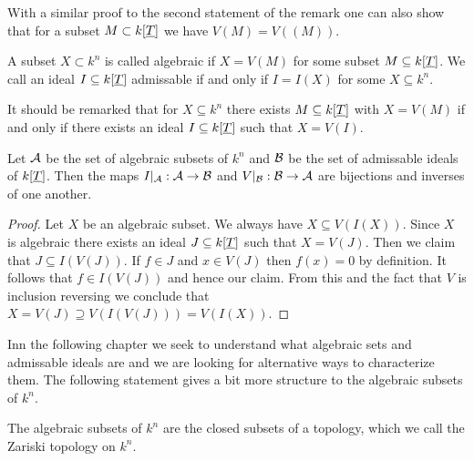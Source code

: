 \documentclass[../notes.tex]{subfiles}
\begin{document}
\noindent
With a similar proof to the second statement of the remark one can also show that
for a subset $M \subset k[{\underline{T}}]$ we have $V(M) = V((M))$.

\smallskip
\begin{defi}{}{}
  A subset $X \subset k^n$ is called algebraic if $X = V(M)$ for some subset
  $M \subseteq k[{\underline{T}}]$. We call an ideal $I \subseteq k[{\underline{T}}]$ admissable
  if and only if $I = I(X)$ for some $X \subseteq k^n$.
\end{defi}

\smallskip
\noindent It should be remarked that for $X \subseteq k^n$ there exists $M \subseteq k[{\underline{T}}]$
with $X = V(M)$ if and only if there exists an ideal $I \subseteq k[{\underline{T}}]$
such that $X = V(I)$.

\smallskip
\begin{lemm}{}{}
  Let ${\mathcal{A}}$ be the set of algebraic subsets of $k^n$ and ${\mathcal{B}}$ be the set of
  admissable ideals of $k[{\underline{T}}]$. Then the
  maps $I|_{\mathcal{A}}: {\mathcal{A}} \to {\mathcal{B}}$ and $V|_{\mathcal{B}}: {\mathcal{B}} \to {\mathcal{A}}$ are bijections and inverses of one another.
\end{lemm}

\begin{proof}
  Let $X$ be an algebraic subset. We always have $X \subseteq V(I(X))$.
  Since $X$ is algebraic there exists an ideal $J \subseteq k[{\underline{T}}]$ such that $X = V(J)$.
  Then we claim that $J \subseteq I(V(J))$. If $f \in J$ and $x \in V(J)$ then
  $f(x) = 0$ by definition. It follows that $f \in I(V(J))$ and hence our claim.
  From this and the fact that $V$ is inclusion reversing we  conclude that
  $X = V(J) \supseteq V(I(V(J))) = V(I(X))$.
  
\end{proof}

\smallskip
\noindent
Inn the following chapter we seek to understand what algebraic sets and admissable ideals
are and we are looking for alternative ways to characterize them. The following statement
gives a bit more structure to the algebraic subsets of $k^n$.

\smallskip
\begin{lemm}{}{}
  The algebraic subsets of $k^n$ are the closed subsets of a topology, which we
  call the Zariski topology on $k^n$.
\end{lemm}
\end{document}
